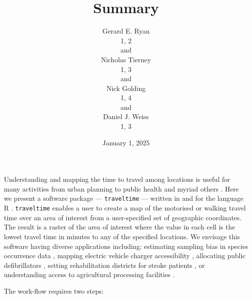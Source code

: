 \documentclass[
  12pt]{article}
\begin{document}
\def\spacingset#1{\renewcommand{\baselinestretch}%
{#1}\small\normalsize} \spacingset{1}



\date{January 1, 2025}
\title{\bf Summary}
\author{
Gerard E. Ryan\\
1, 2\\
and\\Nicholas Tierney\\
1, 3\\
and\\Nick Golding\\
1, 4\\
and\\Daniel J. Weiss\\
1, 3\\
}
\maketitle

\bigskip
\bigskip
\begin{abstract}

\end{abstract}


\newpage
\spacingset{1.9} %


Understanding and mapping the time to travel among locations is useful
for many activities from urban planning \citep{zahavi1974traveltime} to
public health \citep{hulland2019travel, weiss2020global} and myriad
others \citep{nelson2019suite}. Here we present a software package ---
\texttt{traveltime} --- written in and for the language R \citep{Rref}.
\texttt{traveltime} enables a user to create a map of the motorised or
walking travel time over an area of interest from a user-specified set
of geographic coordinates. The result is a raster of the area of
interest where the value in each cell is the lowest travel time in
minutes to any of the specified locations. We envisage this software
having diverse applications including: estimating sampling bias in
species occurrence data \citep[@reddy2003geographical]{dennis2000bias},
mapping electric vehicle charger accessibility
\citep{falchetta2021electric}, allocating public defibrillators
\citep{tierney2018novel}, setting rehabilitation districts for stroke
patients \citep{padgham2019introduction}, or understanding access to
agricultural processing facilities \citep{zhao2023replanting}.

The work-flow requires two steps:
\end{document}
